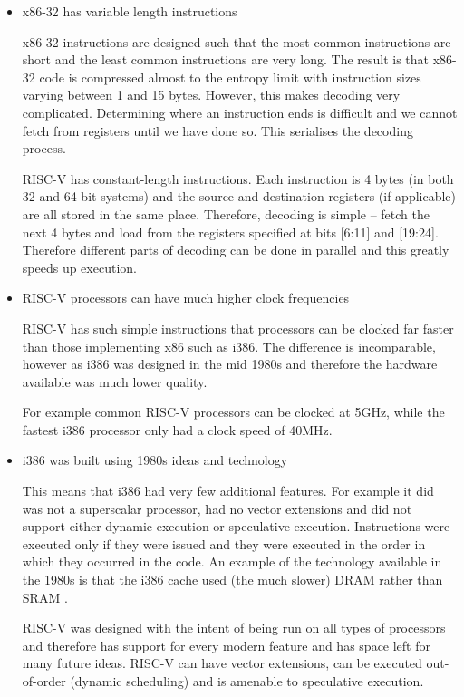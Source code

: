 \documentclass[10pt,\jkfside,a4paper]{article}
\begin{document}
\begin{enumerate}
\begin{itemize}
\item x86-32 has variable length instructions

x86-32 instructions are designed such that the most common instructions are
short and the least common instructions are very long. The result is that
x86-32 code is compressed almost to the entropy limit with instruction sizes
varying between 1 and 15 bytes. However, this makes decoding very
complicated. Determining where an instruction ends is difficult and we
cannot fetch from registers until we have done so. This serialises the
decoding process.

RISC-V has constant-length instructions. Each instruction is 4 bytes (in
both 32 and 64-bit systems) and the source and destination registers (if
applicable) are all stored in the same place. Therefore, decoding is simple
-- fetch the next 4 bytes and load from the registers specified at bits
[6:11] and [19:24]. Therefore different parts of decoding can be done in
parallel and this greatly speeds up execution.

\item RISC-V processors can have much higher clock frequencies

RISC-V has such simple instructions that processors can be clocked far
faster than those implementing x86 such as i386. The difference is
incomparable, however as i386 was designed in the mid 1980s and therefore
the hardware available was much lower quality.

For example common RISC-V processors can be clocked at 5GHz, while the
fastest i386 processor only had a clock speed of 40MHz.

\item i386 was built using 1980s ideas and technology

This means that i386 had very few additional features. For example it did
was not a superscalar processor, had no vector extensions and did not support
either dynamic execution or speculative execution. Instructions were
executed only if they were issued and they were executed in the order in
which they occurred in the code. An example of the technology available in
the 1980s is that the i386 cache used (the much slower) DRAM rather than SRAM .

RISC-V was designed with the intent of being run on all types of processors
and therefore has support for every modern feature and has space left for
many future ideas. RISC-V can have vector extensions, can be executed
out-of-order (dynamic scheduling) and is amenable to speculative execution.


\end{itemize}
\end{enumerate}
\end{document}
